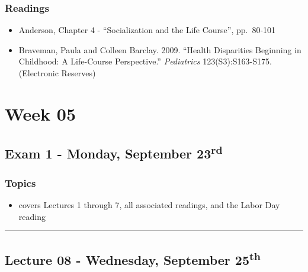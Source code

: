 \documentclass[]{book}
\providecommand{\tightlist}{%
  \setlength{\itemsep}{0pt}\setlength{\parskip}{0pt}}
\begin{document}
\hypertarget{readings-7}{%
\subsubsection*{Readings}\label{readings-7}}

\begin{itemize}
\tightlist
\item
  Anderson, Chapter 4 - ``Socialization and the Life Course'', pp.~80-101
\item
  Braveman, Paula and Colleen Barclay. 2009. ``Health Disparities Beginning in Childhood: A Life-Course Perspective.'' \emph{Pediatrics} 123(S3):S163-S175. (Electronic Reserves)
\end{itemize}

\newpage

\hypertarget{week-05}{%
\section*{Week 05}\label{week-05}}

\hypertarget{exam-1---monday-september-23rd}{%
\subsection*{\texorpdfstring{Exam 1 - Monday, September 23\textsuperscript{rd}}{Exam 1 - Monday, September 23rd}}\label{exam-1---monday-september-23rd}}

\hypertarget{topics-8}{%
\subsubsection*{Topics}\label{topics-8}}

\begin{itemize}
\tightlist
\item
  covers Lectures 1 through 7, all associated readings, and the Labor Day reading
\end{itemize}

\begin{center}\rule{0.5\linewidth}{\linethickness}\end{center}

\hypertarget{lecture-08---wednesday-september-25th}{%
\subsection*{\texorpdfstring{Lecture 08 - Wednesday, September 25\textsuperscript{th}}{Lecture 08 - Wednesday, September 25th}}\label{lecture-08---wednesday-september-25th}}
\end{document}
